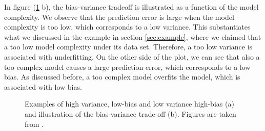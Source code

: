 In figure (\ref{fig:bias_variance} b), the bias-variance tradeoff is illustrated as a function of the model complexity. We observe that the prediction error is large when the model complexity is too low, which corresponds to a low variance. This substantiates what we discussed in the example in section \ref{sec:example}, where we claimed that a too low model complexity under its data set. Therefore, a too low variance is associated with underfitting. On the other side of the plot, we can see that also a too complex model causes a large prediction error, which corresponds to a low bias. As discussed before, a too complex model overfits the model, which is associated with low bias. 

\begin{figure}
	\centering
	\caption{Examples of high variance, low-bias and low variance high-bias (a) and illustration of the bias-variance trade-off (b). Figures are taken from \citet{mehta_high-bias_2019}.}%
	\label{fig:bias_variance}
\end{figure}

